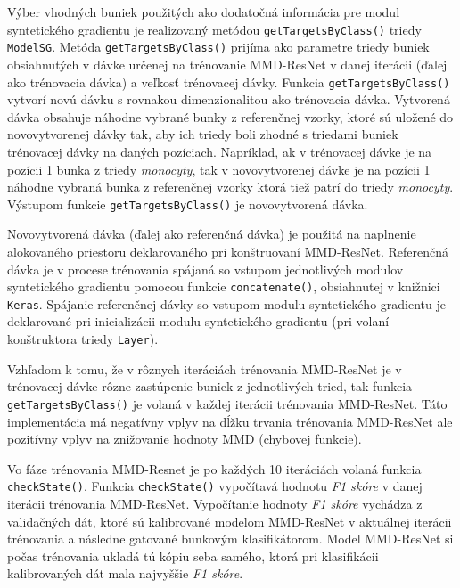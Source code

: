 Výber vhodných buniek použitých ako dodatočná informácia pre modul syntetického gradientu je realizovaný metódou \texttt{getTargetsByClass()} triedy \texttt{ModelSG}. Metóda \texttt{getTargetsByClass()} prijíma ako parametre triedy buniek obsiahnutých v dávke určenej na trénovanie MMD-ResNet v danej iterácii (ďalej ako trénovacia dávka) a veľkosť trénovacej dávky. Funkcia \texttt{getTargetsByClass()} vytvorí novú dávku s rovnakou dimenzionalitou ako trénovacia dávka. Vytvorená dávka obsahuje náhodne vybrané bunky z referenčnej vzorky, ktoré sú uložené do novovytvorenej dávky tak, aby ich triedy boli zhodné s triedami buniek trénovacej dávky na daných pozíciach. Napríklad, ak v trénovacej dávke je na pozícii 1 bunka z triedy \textit{monocyty}, tak v novovytvorenej dávke je na pozícii 1 náhodne vybraná bunka z referenčnej vzorky ktorá tiež patrí do triedy \textit{monocyty}. Výstupom funkcie \texttt{getTargetsByClass()} je novovytvorená dávka.

Novovytvorená dávka (ďalej ako referenčná dávka) je použitá na naplnenie alokovaného priestoru deklarovaného pri konštruovaní MMD-ResNet. Referenčná dávka je v procese trénovania spájaná so vstupom jednotlivých modulov syntetického gradientu pomocou funkcie \texttt{concatenate()}, obsiahnutej v knižnici \texttt{Keras}. Spájanie referenčnej dávky so vstupom modulu syntetického gradientu je deklarované pri inicializácii modulu syntetického gradientu (pri volaní konštruktora triedy \texttt{Layer}). 

Vzhľadom k tomu, že v rôznych iteráciách trénovania MMD-ResNet je v trénovacej dávke rôzne zastúpenie buniek z jednotlivých tried, tak funkcia \texttt{getTargetsByClass()} je volaná v každej iterácii trénovania MMD-ResNet. Táto implementácia má negatívny vplyv na dĺžku trvania trénovania MMD-ResNet ale pozitívny vplyv na znižovanie hodnoty MMD (chybovej funkcie).

\begin{sloppypar}
Vo fáze trénovania MMD-Resnet je po každých 10 iteráciách volaná funkcia \texttt{checkState()}. Funkcia \texttt{checkState()} vypočítavá hodnotu \textit{F1 skóre} v danej iterácii trénovania MMD-ResNet. Vypočítanie hodnoty \textit{F1 skóre} vychádza z validačných dát, ktoré sú kalibrované modelom MMD-ResNet v aktuálnej iterácii trénovania a následne gatované bunkovým klasifikátorom. Model MMD-ResNet si počas trénovania ukladá tú kópiu seba samého, ktorá pri klasifikácii kalibrovaných dát mala najvyššie \textit{F1 skóre}.
\end{sloppypar}

